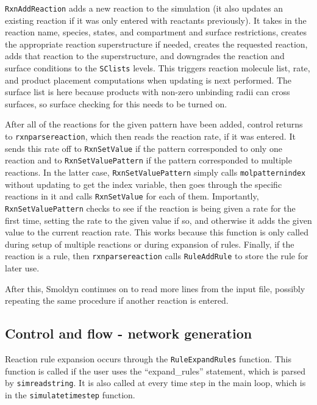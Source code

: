 \documentclass {book}
\begin{document}
\texttt{RxnAddReaction} adds a new reaction to the simulation (it also updates an existing reaction if it was only entered with reactants previously). It takes in the reaction name, species, states, and compartment and surface restrictions, creates the appropriate reaction superstructure if needed, creates the requested reaction, adds that reaction to the superstructure, and downgrades the reaction and surface conditions to the \texttt{SClists} levels. This triggers reaction molecule list, rate, and product placement computations when updating is next performed. The surface list is here because products with non-zero unbinding radii can cross surfaces, so surface checking for this needs to be turned on.

After all of the reactions for the given pattern have been added, control returns to \texttt{rxnparsereaction}, which then reads the reaction rate, if it was entered. It sends this rate off to \texttt{RxnSetValue} if the pattern corresponded to only one reaction and to \texttt{RxnSetValuePattern} if the pattern corresponded to multiple reactions. In the latter case, \texttt{RxnSetValuePattern} simply calls \texttt{molpatternindex} without updating to get the index variable, then goes through the specific reactions in it and calls \texttt{RxnSetValue} for each of them. Importantly, \texttt{RxnSetValuePattern} checks to see if the reaction is being given a rate for the first time, setting the rate to the given value if so, and otherwise it adds the given value to the current reaction rate. This works because this function is only called during setup of multiple reactions or during expansion of rules. Finally, if the reaction is a rule, then \texttt{rxnparsereaction} calls \texttt{RuleAddRule} to store the rule for later use.

After this, Smoldyn continues on to read more lines from the input file, possibly repeating the same procedure if another reaction is entered.

\subsection*{Control and flow - network generation}

Reaction rule expansion occurs through the \texttt{RuleExpandRules} function. This function is called if the user uses the ``expand\_rules'' statement, which is parsed by \texttt{simreadstring}. It is also called at every time step in the main loop, which is in the \texttt{simulatetimestep} function.
\end{document}
